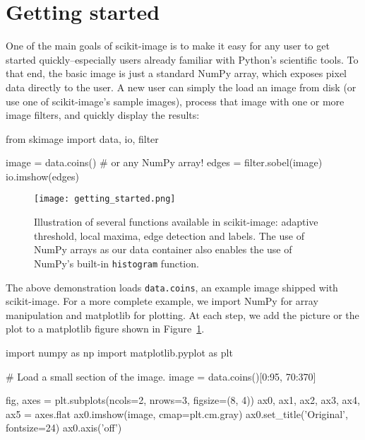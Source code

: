 
\section*{Getting started}
  \label{sec:getting-started}

  One of the main goals of scikit-image is to make it easy for any user to get started quickly--especially users already familiar with Python's scientific tools. To that end, the basic image is just a standard NumPy array, which exposes pixel data directly to the user. A new user can simply the load an image from disk (or use one of scikit-image's sample images), process that image with one or more image filters, and quickly display the results:

  \begin{pyverbatim}
    from skimage import data, io, filter

    image = data.coins()  # or any NumPy array!
    edges = filter.sobel(image)
    io.imshow(edges)
  \end{pyverbatim}

  \begin{figure}
    \texttt{[image: getting\_started.png]}

    \caption[Getting started figure]{\label{fig:gettingstarted}Illustration of several functions available in scikit-image: adaptive threshold, local maxima, edge detection and labels. The use of NumPy arrays as our data container also enables the use of NumPy's built-in \texttt{histogram} function.}
  \end{figure}

  The above demonstration loads \texttt{data.coins}, an example image shipped with scikit-image.  For a more complete example, we import NumPy for array manipulation and matplotlib for plotting.  At each step, we add the picture or the plot to a matplotlib figure shown in Figure~\ref{fig:gettingstarted}.

  \begin{pyverbatim}
    import numpy as np
    import matplotlib.pyplot as plt

    # Load a small section of the image.
    image = data.coins()[0:95, 70:370]

    fig, axes = plt.subplots(ncols=2, nrows=3,
                             figsize=(8, 4))
    ax0, ax1, ax2, ax3, ax4, ax5  = axes.flat
    ax0.imshow(image, cmap=plt.cm.gray)
    ax0.set_title('Original', fontsize=24)
    ax0.axis('off')
  \end{pyverbatim}

